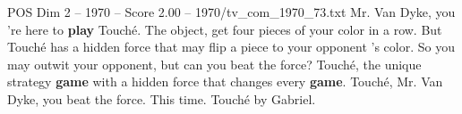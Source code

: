 \begin{textsample}{POS Dim 2 – 1970 – Score 2.00 – 1970/tv\_com\_1970\_73.txt}  \label{ex:f2_pos_053}
Mr.
Van Dyke, you 're here to \textbf{play} Touché.
The object, get four pieces of your color in a row.
But Touché has a hidden force that may flip a piece to your opponent 's color.
So you may outwit your opponent, but can you beat the force?
Touché, the unique strategy \textbf{game} with a hidden force that changes every \textbf{game}.
Touché, Mr.
Van Dyke, you beat the force.
This time.
Touché by Gabriel.

\end{textsample}
